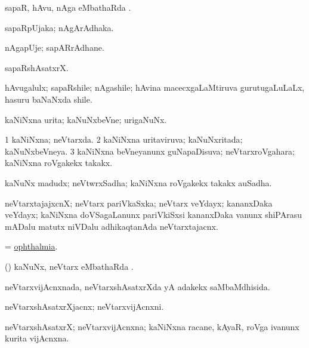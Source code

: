\bentry
{}
\gl{\sapUpa}
\bmng
sapaR, hAvu, nAga eMbathaRda \sapUpa. 
\emng
\eentry

\bentry
{}
\gl{\nA}
\bmng
sapaRpUjaka; nAgArAdhaka. 
\emng
\eentry

\bentry
{}
\gl{\nA}
\bmng
nAgapUje; sapARrAdhane. 
\emng
\eentry

\bentry
{}
\gl{\nA}
\bmng
sapaRshAsatxrX. 
\emng
\eentry

\bentry
{}
\gl{\nA}
\bmng
hAvugalulx; sapaRshile; nAgashile; hAvina macecxgaLaMtiruva gurutugaLuLaLx, hasuru baNaNxda shile. 
\emng
\eentry

\bentry
{}
\gl{\nA}
\bmng
kaNiNxna urita; kaNuNxbeVne; urigaNuNx. 
\emng
\eentry

\bentry
{}
\gl{\gu}
\bmng
\bnum
\num{1} kaNiNxna; neVtarxda. 
\num{2} kaNiNxna uritaviruva; kaNuNxritada; kaNuNxbeVneya. 
\num{3} kaNiNxna beVneyanunx guNapaDisuva; neVtarxroVgahara; kaNiNxna roVgakekx takakx. 
\enum
\emng
\eentry

\bentry
{}
\gl{\nA}
\bmng
kaNuNx madudx; neVtwrxSadha; kaNiNxna roVgakekx takakx auSadha. 
\emng
\eentry

\bentry
{}
\gl{\nA}
\bmng
neVtarxtajajxcnX; neVtarx pariVkaSxka; neVtarx veYdayx; kananxDaka veYdayx; kaNiNxna doVSagaLanunx pariVkiSxsi kananxDaka \mo vanunx shiPArasu mADalu matutx niVDalu adhikaqtanAda neVtarxtajacnx. 
\emng
\eentry

\bentry
{}
\gl{\nA}
\bmng
= \hyperlink{ophthalmia}{ophthalmia}. 
\emng
\eentry

\bentry
{}
\gl{\sapUpa}
\bmng
(\daqvi) kaNuNx, neVtarx eMbathaRda \sapUpa. 
\emng
\eentry

\bentry
{}
\gl{\gu}
\bmng
neVtarxvijAcnxnada, neVtarxshAsatxrXda yA adakekx saMbaMdhisida. 
\emng
\eentry

\bentry
{}
\gl{\nA}
\bmng
neVtarxshAsatxrXjacnx; neVtarxvijAcnxni. 
\emng
\eentry

\bentry
{}
\gl{\nA}
\bmng
neVtarxshAsatxrX; neVtarxvijAcnxna; kaNiNxna racane, kAyaR, roVga ivanunx kurita vijAcnxna. 
\emng
\eentry

